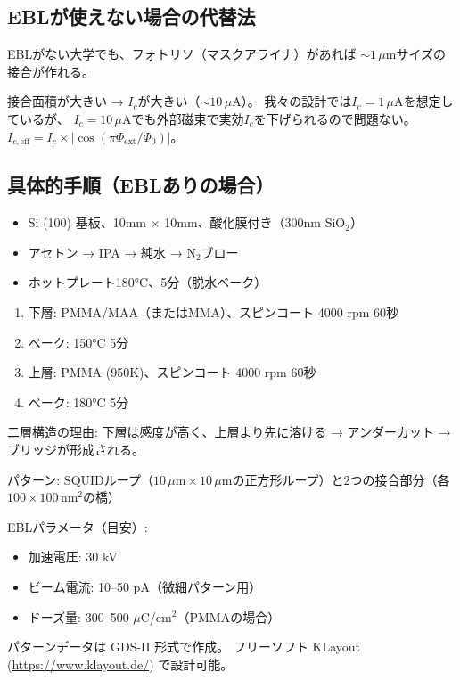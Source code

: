 \documentclass[12pt,a4paper]{article}
\begin{document}
\subsection{EBLが使えない場合の代替法}

\begin{theorybox}
EBLがない大学でも、フォトリソ（マスクアライナ）があれば
$\sim 1\,\mu\mathrm{m}$サイズの接合が作れる。

接合面積が大きい → $I_c$が大きい（$\sim 10\,\mu$A）。
我々の設計では$I_c = 1\,\mu$Aを想定しているが、
$I_c = 10\,\mu$Aでも外部磁束で実効$I_c$を下げられるので問題ない。
$I_{c,\mathrm{eff}} = I_c \times |\cos(\pi\Phi_{\mathrm{ext}}/\Phi_0)|$。
\end{theorybox}

\subsection{具体的手順（EBLありの場合）}

\begin{practicebox}
\begin{itemize}
\item Si (100) 基板、10mm $\times$ 10mm、酸化膜付き（300nm SiO$_2$）
\item アセトン → IPA → 純水 → N$_2$ブロー
\item ホットプレート180°C、5分（脱水ベーク）
\end{itemize}
\end{practicebox}

\begin{practicebox}
\begin{enumerate}
\item 下層: PMMA/MAA（またはMMA）、スピンコート 4000 rpm 60秒
\item ベーク: 150°C 5分
\item 上層: PMMA (950K)、スピンコート 4000 rpm 60秒
\item ベーク: 180°C 5分
\end{enumerate}
二層構造の理由: 下層は感度が高く、上層より先に溶ける → アンダーカット → ブリッジが形成される。
\end{practicebox}

\begin{practicebox}
パターン: SQUIDループ（$10\,\mu\mathrm{m} \times 10\,\mu\mathrm{m}$の正方形ループ）と2つの接合部分（各$100 \times 100\,\mathrm{nm}^2$の橋）

EBLパラメータ（目安）:
\begin{itemize}
\item 加速電圧: 30 kV
\item ビーム電流: 10--50 pA（微細パターン用）
\item ドーズ量: 300--500 $\mu$C/cm$^2$（PMMAの場合）
\end{itemize}

パターンデータは GDS-II 形式で作成。
フリーソフト KLayout (\url{https://www.klayout.de/}) で設計可能。
\end{practicebox}
\end{document}
